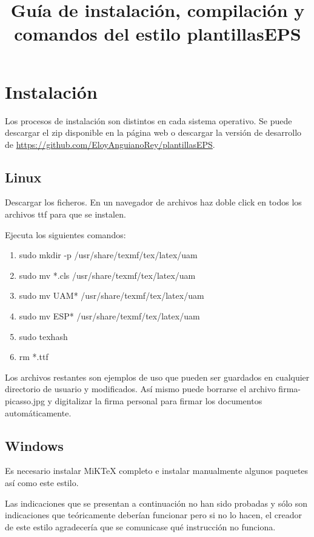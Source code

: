 \documentclass[numerado,carta]{plantillasEPS} %
\title{Guía de instalación, compilación y comandos del estilo plantillasEPS} %
\begin{document}
\chapter{Instalación}

Los procesos de instalación son distintos en cada sistema operativo. Se puede descargar el zip disponible en la página web o descargar la versión de desarrollo de \href{https://github.com/EloyAnguianoRey/plantillasEPS}{https://github.com/EloyAnguianoRey/plantillasEPS}.

\section{Linux}

Descargar los ficheros. En un navegador de archivos haz doble click en todos los archivos ttf para que se instalen.

Ejecuta los siguientes comandos:
\begin{enumerate}
    \item sudo mkdir -p /usr/share/texmf/tex/latex/uam
    \item sudo mv *.cls /usr/share/texmf/tex/latex/uam
    \item sudo mv UAM* /usr/share/texmf/tex/latex/uam
    \item sudo mv ESP* /usr/share/texmf/tex/latex/uam
    \item sudo texhash
    \item rm *.ttf
\end{enumerate}

Los archivos restantes son ejemplos de uso que pueden ser guardados en cualquier directorio de usuario y modificados. Así mismo puede borrarse el archivo firma-picasso.jpg y digitalizar la firma personal para firmar los documentos automáticamente.


\section{Windows\textsuperscript{\texttrademark}}

Es necesario instalar MiKTeX completo e instalar manualmente algunos paquetes así como este estilo.

Las indicaciones que se presentan a continuación no han sido probadas y sólo son indicaciones que teóricamente deberían funcionar pero si no lo hacen, el creador de este estilo agradecería que se comunicase qué instrucción no funciona.
\end{document}
